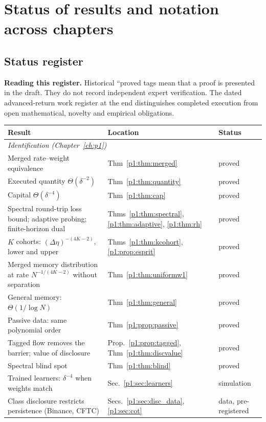 \chapter{Status of results and notation across chapters}\label{app:status}

\section{Status register}
\noindent\textbf{Reading this register.} Historical ``proved tags mean that a proof is presented in the draft. They do not record independent expert verification. The dated advanced-return work register at the end distinguishes completed execution from open mathematical, novelty and empirical obligations.


\begin{longtable}{p{}p{}p{}}
\toprule
Result & Location & Status\\
\midrule
\endhead
\multicolumn{3}{l}{\emph{Identification (Chapter~\ref{ch:p1})}}\\
Merged rate--weight equivalence & Thm~\ref{p1:thm:merged} & proved\\
Executed quantity $\Theta(\delta^{-2})$ & Thm~\ref{p1:thm:quantity} & proved\\
Capital $\Theta(\delta^{-4})$ & Thm~\ref{p1:thm:cap} & proved\\
Spectral round-trip loss bound; adaptive probing; finite-horizon dual & Thms~\ref{p1:thm:spectral}, \ref{p1:thm:adaptive}, \ref{p1:thm:rh} & proved\\
$K$ cohorts: $(\Delta\eta)^{-(4K-2)}$, lower and upper & Thms~\ref{p1:thm:kcohort}, \ref{p1:prop:esprit} & proved\\
Merged memory distribution at rate $N^{-1/(4K-2)}$ without separation & Thm~\ref{p1:thm:uniformw1} & proved\\
General memory: $\Theta(1/\log N)$ & Thm~\ref{p1:thm:general} & proved\\
Passive data: same polynomial order & Thm~\ref{p1:prop:passive} & proved\\
Tagged flow removes the barrier; value of disclosure & Prop.~\ref{p1:prop:tagged}, Thm~\ref{p1:thm:discvalue} & proved\\
Spectral blind spot & Thm~\ref{p1:thm:blind} & proved\\
Trained learners: $\delta^{-4}$ when weights match & Sec.~\ref{p1:sec:learners} & simulation\\
Class disclosure restricts persistence (Binance, CFTC) & Secs.~\ref{p1:sec:disc_data}, \ref{p1:sec:cot} & data, pre-registered\\

\end{longtable}

